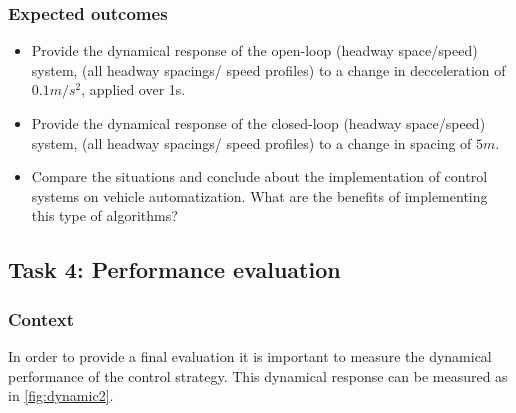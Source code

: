 \documentclass[]{book}
\providecommand{\tightlist}{%
  \setlength{\itemsep}{0pt}\setlength{\parskip}{0pt}}
\theoremstyle{definition}
\theoremstyle{definition}
\theoremstyle{definition}
\theoremstyle{remark}
\begin{document}
\hypertarget{expected-outcomes-6}{%
\subsubsection*{Expected outcomes}\label{expected-outcomes-6}}

\begin{itemize}
\tightlist
\item
  Provide the dynamical response of the open-loop (headway space/speed)
  system, (all headway spacings/ speed profiles) to a change in
  decceleration of \(0.1m/s^2\), applied over 1s.\\
\item
  Provide the dynamical response of the closed-loop (headway
  space/speed) system, (all headway spacings/ speed profiles) to a
  change in spacing of \(5m\).
\item
  Compare the situations and conclude about the implementation of
  control systems on vehicle automatization. What are the benefits of
  implementing this type of algorithms?
\end{itemize}

\hypertarget{task-4-performance-evaluation-1}{%
\subsection*{Task 4: Performance
evaluation}\label{task-4-performance-evaluation-1}}

\hypertarget{context-8}{%
\subsubsection*{Context}\label{context-8}}

In order to provide a final evaluation it is important to measure the
dynamical performance of the control strategy. This dynamical response
can be measured as in \ref{fig:dynamic2}.
\end{document}
